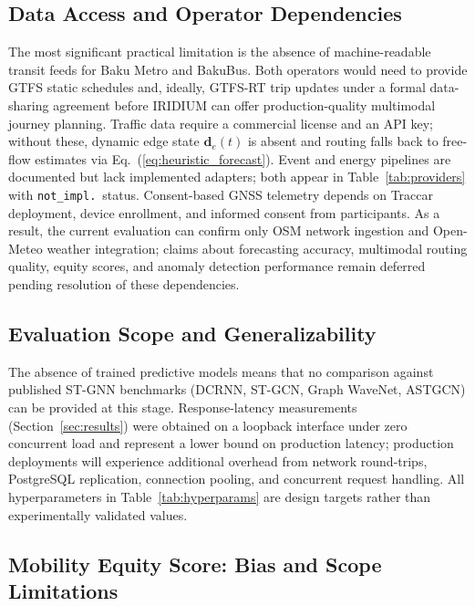 
\subsection{Data Access and Operator Dependencies}

The most significant practical limitation is the absence of machine-readable
transit feeds for Baku Metro and BakuBus.
Both operators would need to provide GTFS static schedules and, ideally,
GTFS-RT trip updates under a formal data-sharing agreement before IRIDIUM
can offer production-quality multimodal journey planning.
Traffic data require a commercial license and an API key; without these,
dynamic edge state $\mathbf{d}_e(t)$ is absent and routing falls back to
free-flow estimates via Eq.~(\ref{eq:heuristic_forecast}).
Event and energy pipelines are documented but lack implemented adapters;
both appear in Table~\ref{tab:providers} with \texttt{not\_impl.}\ status.
Consent-based GNSS telemetry depends on Traccar deployment, device enrollment,
and informed consent from participants.
As a result, the current evaluation can confirm only OSM network ingestion
and Open-Meteo weather integration; claims about forecasting accuracy,
multimodal routing quality, equity scores, and anomaly detection performance
remain deferred pending resolution of these dependencies.

\subsection{Evaluation Scope and Generalizability}

The absence of trained predictive models means that no comparison against
published ST-GNN benchmarks (DCRNN, ST-GCN, Graph WaveNet, ASTGCN)
can be provided at this stage.
Response-latency measurements (Section~\ref{sec:results}) were obtained
on a loopback interface under zero concurrent load and represent a lower
bound on production latency; production deployments will experience
additional overhead from network round-trips, PostgreSQL replication,
connection pooling, and concurrent request handling.
All hyperparameters in Table~\ref{tab:hyperparams} are design targets
rather than experimentally validated values.

\subsection{Mobility Equity Score: Bias and Scope Limitations}

